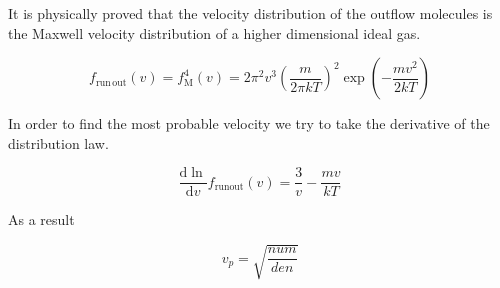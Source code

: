 \documentclass[a4paper,11pt]{amsart}
\theoremstyle{definition}
\begin{document}
	It is physically proved that the velocity distribution of the outflow molecules is the Maxwell velocity distribution of a higher dimensional ideal gas.

	$$
	f_{\mathrm{run}\,\mathrm{out}}\left( v \right) =f_{\mathrm{M}}^{4}\left( v \right) =2\pi ^2v^3\left( \frac{m}{2\pi kT} \right) ^2\exp \left( -\frac{mv^2}{2kT} \right) 
	$$

	In order to find the most probable velocity we try to take the derivative of the distribution law.

	$$
	\frac{\mathrm{d}\ln}{\mathrm{d}v}f_{\mathrm{run} \mathrm{out}}\left( v \right) =\frac{3}{v}-\frac{mv}{kT}
	$$

	As a result

	$$
	v_p=\sqrt{\dfrac{num}{den}}
	$$
\end{document}
